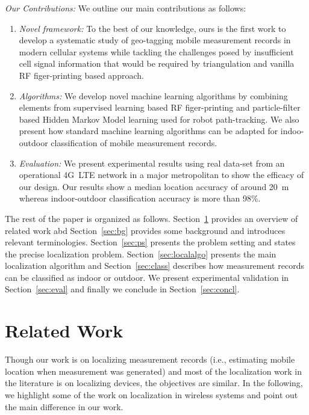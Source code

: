 \documentclass[conference, 10pt]{IEEEtran}
\begin{document}
{\em Our Contributions:} We outline our main contributions as follows:
\begin{enumerate}

\item {\em Novel framework:} To the best of our knowledge, ours is the first work to develop a systematic
study of geo-tagging mobile measurement records in modern cellular systems
while tackling the challenges posed by insufficient cell signal information
that would be required by triangulation and vanilla RF figer-printing based
approach. 

\item  {\em Algorithms:} We develop novel machine learning algorithms by combining elements from
supervised learning based RF figer-printing and particle-filter based Hidden Markov
Model learning used for robot path-tracking. We also present how standard machine
learning algorithms can be adapted for indoo-outdoor classification of mobile
measurement records.

\item {\em Evaluation:} We present experimental results using real data-set from an operational 4G~LTE
network in a major metropolitan to show the efficacy of our design. Our results show
a median location  accuracy of around 20~m whereas indoor-outdoor classification
accuracy is more than 98\%.


\end{enumerate}

The rest of the paper is organized as follows. Section~\ref{sec:rw} provides an
overview of related work abd Section~\ref{sec:bg} provides some
background and introduces relevant terminologies. Section~\ref{sec:ps} presents
the problem setting and states the precise localization problem.
Section~\ref{sec:localalgo}
presents the main localization algorithm and Section~\ref{sec:class} describes 
how measurement records can be classified as indoor or outdoor. We present
experimental validation in Section~\ref{sec:eval} and finally we conclude in
Section~\ref{sec:concl}.


\section{Related Work}
\label{sec:rw}

Though our work is on localizing measurement records (i.e., estimating mobile location
when measurement was generated) and most of the localization work
in the literature is on localizing devices, the objectives are similar. In the
following, we highlight some of the work on localization in wireless systems and
point out the main difference in our work.
\end{document}

